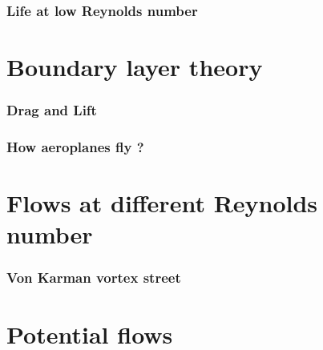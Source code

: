 \documentclass{tufte-book} %
\begin{document}
\subsection{Life at low Reynolds number}
\chapter{Boundary layer theory}
\subsection{Drag and Lift}
\subsection{How aeroplanes fly ?}

\chapter{Flows at different Reynolds number}
\subsection{Von Karman vortex street}

\chapter{Potential flows}




\backmatter



\printindex %
\end{document}
